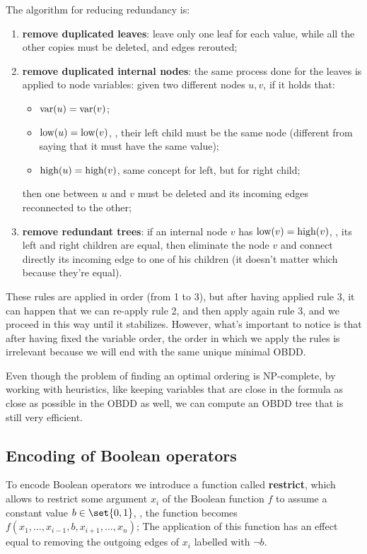\documentclass[oneside]{academica}
\begin{document}
The algorithm for reducing redundancy is:
\begin{enumerate}
  \item \textbf{remove duplicated leaves}: leave only one leaf for each value, while all the other copies must be deleted, and edges rerouted;
  \item \textbf{remove duplicated internal nodes}: the same process done for the leaves is applied to node variables: given two different nodes $u,v$, if it holds that:
    \begin{itemize}
      \item $\text{var}(u) = \text{var}(v)$;
      \item $\text{low}(u) = \text{low}(v)$, \ie, their left child must be the same node (different from saying that it must have the same value);
      \item $\text{high}(u) = \text{high}(v)$, same concept for left, but for right child;
    \end{itemize}
    then one between $u$ and $v$ must be deleted and its incoming edges reconnected to the other;
  \item \textbf{remove redundant trees}: if an internal node $v$ has $\text{low}(v) = \text{high}(v)$, \ie, its left and right children are equal, then eliminate the node $v$ and connect directly its incoming edge to one of his children (it doesn't matter which because they're equal).
\end{enumerate}
These rules are applied in order (from 1 to 3), but after having applied rule 3, it can happen that we can re-apply rule 2, and then apply again rule 3, and we proceed in this way until it stabilizes.
However, what's important to notice is that after having fixed the variable order, the order in which we apply the rules is irrelevant because we will end with the same unique minimal OBDD.

Even though the problem of finding an optimal ordering is NP-complete, by working with heuristics, like keeping variables that are close in the formula as close as possible in the OBDD as well, we can compute an OBDD tree that is still very efficient.

\subsection{Encoding of Boolean operators}

To encode Boolean operators we introduce a function called \textbf{restrict}, which allows to restrict some argument $x_i$ of the Boolean function $f$ to assume a constant value $b \in \set{0,1}$, \ie, the function becomes $f(x_1,\dots,x_{i-1},b,x_{i+1},\dots,x_n)$;
The application of this function has an effect equal to removing the outgoing edges of $x_i$ labelled with $\neg b$.
\end{document}
